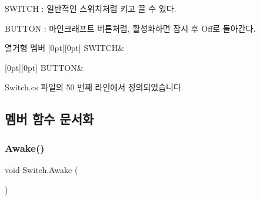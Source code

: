 \begin{DoxyItemize}
\item S\+W\+I\+T\+CH \+: 일반적인 스위치처럼 키고 끌 수 있다.~\newline

\item B\+U\+T\+T\+ON \+: 마인크래프트 버튼처럼, 활성화하면 잠시 후 Off로 돌아간다. 
\end{DoxyItemize}\begin{DoxyEnumFields}{열거형 멤버}
[0pt][0pt]{}\mbox{\label{class_switch_aa3d83cf921138e9b74aa9a28f1970a3fa4239f063a3d4fb9d38a0182be6e39e76}} 
S\+W\+I\+T\+CH&\\
\hline

[0pt][0pt]{}\mbox{\label{class_switch_aa3d83cf921138e9b74aa9a28f1970a3fa57b35198356d373bcd2a6e08abcb3795}} 
B\+U\+T\+T\+ON&\\
\hline

\end{DoxyEnumFields}


Switch.\+cs 파일의 50 번째 라인에서 정의되었습니다.


\begin{DoxyCode}{0}

\end{DoxyCode}


\subsection{멤버 함수 문서화}
\mbox{\label{class_switch_a9988b93ae4cd0954c17f4f4bee3ef247}} 
\subsubsection{\texorpdfstring{Awake()}{Awake()}}
{\footnotesize\ttfamily void Switch.\+Awake (\begin{DoxyParamCaption}{ }\end{DoxyParamCaption})\hspace{0.3cm}{\ttfamily [private]}}



